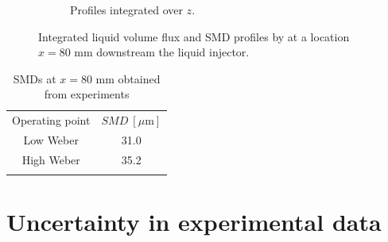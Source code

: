 \begin{figure}[h!]
\begin{subfigure}[b]{0.45\textwidth}
   \caption{Profiles integrated over $z$.}
  \label{fig:integrated_results_Becker_expe_results_over_z}
\end{subfigure}
\caption[{Integrated liquid volume flux and SMD profiles by  at a location $x = 80$ mm downstream the liquid injector.}]{Integrated liquid volume flux and SMD profiles by  at a location $x = 80$ mm downstream the liquid injector. }
\label{fig:integrated_results_Becker_expe_results}
\end{figure}

\begin{table}[!h]
\centering
\caption{SMDs at $x = 80$ mm obtained from experiments }
\begin{tabular}{cc}
\thickhline
Operating point & $SMD~\left[ \mu \mathrm{m}\right]$  \\
\thickhline
Low Weber & 31.0  \\  
High Weber & 35.2 \\
\thickhline
\end{tabular}
\label{tab:becker_hassa_SMD_values_sprays}
\end{table}


\section{Uncertainty in experimental data}

